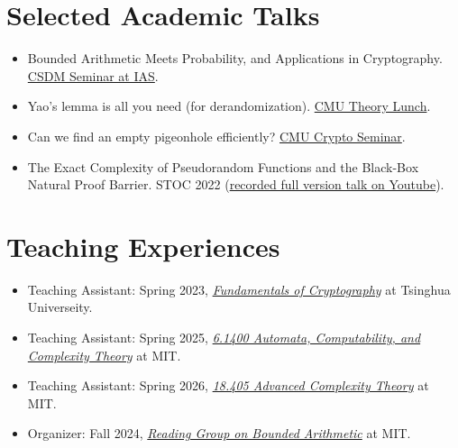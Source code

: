 \documentclass[a4paper, 11pt]{article}
\begin{document}
\vspace{-5pt}


\section{Selected Academic Talks}
    \begin{itemize}[itemsep=-3pt,parsep=3pt,topsep=-5pt]
        \item Bounded Arithmetic Meets Probability, and Applications in Cryptography. \href{https://www.youtube.com/watch?v=wRMWJVcdWII}{CSDM Seminar at IAS}.
        \item Yao's lemma is all you need (for derandomization). \href{https://www.youtube.com/watch?v=Cuhc85uOcso}{CMU Theory Lunch}. 
        \item Can we find an empty pigeonhole efficiently? \href{https://www.youtube.com/watch?v=Bu5BLwxuQ9o}{CMU Crypto Seminar}.
        \item The Exact Complexity of Pseudorandom Functions and the Black-Box Natural Proof Barrier. STOC 2022 (\href{https://www.youtube.com/watch?v=QcBypyG6oMU&t=452s}{recorded full version talk on Youtube}).
    \end{itemize}
    \vspace{-5pt}

\section{Teaching Experiences}

\begin{itemize}[itemsep=-3pt,parsep=3pt,topsep=-5pt]
    \item Teaching Assistant: Spring 2023, \href{http://www.chenyilei.net/cryptography-s2023.html}{\emph{Fundamentals of Cryptography}} at Tsinghua Universeity. 
    \item Teaching Assistant: Spring 2025, \href{https://people.csail.mit.edu/rrw/6.1400-2025/index.html}{\emph{6.1400 Automata, Computability, and Complexity Theory}} at MIT. 
    \item Teaching Assistant: Spring 2026, \href{https://people.csail.mit.edu/rrw/18.405-2026/index.html}{\emph{18.405 Advanced Complexity Theory}} at MIT.
    \item Organizer: Fall 2024, \href{https://github.com/ljt12138/Bounded-Arithmetic-Reading-Group}{\emph{Reading Group on Bounded Arithmetic}} at MIT. 
\end{itemize}
\vspace{-5pt}
\end{document}
